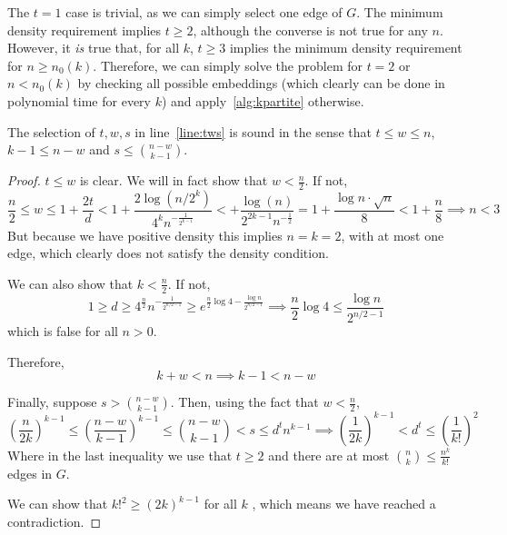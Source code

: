 \begin{remark} %
    The $t=1$ case is trivial, as we can simply select one edge of $G$.
    The minimum density requirement implies $t \geq 2$, although the converse is not true for any $n$.
    However, it \emph{is} true that, for all $k$, $t \geq 3$ implies the minimum density requirement
    for $n \geq n_0(k)$.
    Therefore, we can simply solve the problem for $t = 2$ or $n < n_0(k)$
    by checking all possible embeddings (which clearly can be done in polynomial time for every $k$)
    and apply~\ref{alg:kpartite} otherwise.
\end{remark}

\begin{lemma}
    The selection of $t, w, s$ in line~\ref{line:tws} is sound in the sense that
    $t  \leq w \leq n$, $k - 1 \leq n - w$ and $s \leq \binom{n - w}{k - 1}$.
    \begin{proof}
        $t \leq w$ is clear.
        We will in fact show that $w < \frac{n}{2}$.
        If not,
        \[
            \frac{n}{2} \leq
            w \leq 1 + \frac{2t}{d} <
            1 + \frac{2 \log (n/2^k)}{4^k n^{-\frac{1}{2^{k-1}}}} <
            + \frac{\log(n)}{2^{2k-1} n^{-\frac{1}{2}}} =
            1 + \frac{\log n \cdot \sqrt {n}}{8} <
            1 + \frac{n}{8} \implies n < 3
        \]
        But because we have positive density this implies $n = k = 2$, with at most one edge, which clearly
        does not satisfy the density condition.

        We can also show that $k < \frac{n}{2}$.
        If not,
        \[
            1 \geq
            d \geq
            4^{\frac{n}{2}} n^{-\frac{1}{2^{n/2-1}}} \geq
            e^{\frac{n}{2} \log 4 - \frac{\log n}{2^{n/2-1}}} \implies
            \frac{n}{2} \log 4 \leq \frac{\log n}{2^{n/2-1}}
        \]
        which is false for all $n > 0$. %

        Therefore,
        \[
            k + w < n \implies k - 1 < n - w
        \]

        Finally, suppose $s > \binom{n - w}{k - 1}$.
        Then, using the fact that $w < \frac{n}{2}$,
        \[
            \left( \frac{n}{2k} \right)^{k-1} \leq \left( \frac{n-w}{k-1} \right)^{k-1} \leq \binom{n - w}{k - 1} < s \leq d^t n^{k-1}
            \implies  \left( \frac{1}{2k} \right)^{k-1} < d^t \leq \left( \frac{1}{k!} \right)^2
        \]
        Where in the last inequality we use that $t \geq 2$ and there are at most
        $\binom{n}{k} \leq \frac{n^k}{k!}$ edges in $G$.

        We can show that $k!^2 \geq (2k)^{k-1}$ for all $k$ %
        , which means we have reached a contradiction. \qedhere

    \end{proof}
\end{lemma}

